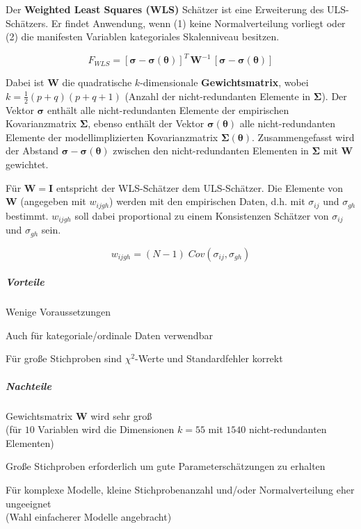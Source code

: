 \documentclass{article}
\numberwithin{equation}{section}
\begin{document}
Der \textbf{Weighted Least Squares (WLS)} Schätzer ist eine Erweiterung des ULS-Schätzers. Er findet Anwendung, wenn (1) keine Normalverteilung vorliegt oder (2) die manifesten Variablen kategoriales Skalenniveau besitzen.

\begin{equation}
F_{WLS} = \left[ \boldsymbol\sigma - \boldsymbol\sigma ( \boldsymbol\theta ) \right]^T \, \mathbf{W}^{-1} \, \left[ \boldsymbol\sigma - \boldsymbol\sigma ( \boldsymbol\theta ) \right]
\end{equation}

Dabei ist $\mathbf{W}$ die quadratische $k$-dimensionale \textbf{Gewichtsmatrix}, wobei $k = \frac{1}{2} (p+q) (p+q+1)$ (Anzahl der nicht-redundanten
Elemente in $\boldsymbol\Sigma$). Der Vektor $\boldsymbol\sigma$ enthält alle nicht-redundanten Elemente der empirischen Kovarianzmatrix $\boldsymbol\Sigma$, ebenso enthält der Vektor $\boldsymbol\sigma ( \boldsymbol\theta )$ alle nicht-redundanten Elemente der modellimplizierten Kovarianzmatrix $\boldsymbol\Sigma ( \boldsymbol\theta )$. Zusammengefasst wird der Abstand $\boldsymbol\sigma - \boldsymbol\sigma ( \boldsymbol\theta )$ zwischen den nicht-redundanten Elementen in $\boldsymbol\Sigma$ mit $\mathbf{W}$ gewichtet.

Für $\mathbf{W} = \mathbf{I}$ entspricht der WLS-Schätzer dem ULS-Schätzer. Die Elemente von $\mathbf{W}$ (angegeben mit $w_{ijgh}$) werden mit den empirischen Daten, d.h. mit $\sigma_{ij}$ und $\sigma_{gh}$ bestimmt. $w_{ijgh}$ soll dabei proportional zu einem Konsistenzen Schätzer von $\sigma_{ij}$ und $\sigma_{gh}$ sein.

\begin{equation}
w_{ijgh} = (N-1)\; Cov(\sigma_{ij},\sigma_{gh})
\end{equation}

\subparagraph*{Vorteile}

\begin{compactitem}
\item Wenige Voraussetzungen
\item Auch für kategoriale/ordinale Daten verwendbar
\item Für große Stichproben sind $\chi^2$-Werte und Standardfehler korrekt
\end{compactitem}

\subparagraph*{Nachteile}

\begin{compactitem}
\item Gewichtsmatrix $\mathbf{W}$ wird sehr groß\\ (für $10$ Variablen wird die Dimensionen $k = 55$ mit $1540$ nicht-redundanten Elementen)
\item Große Stichproben erforderlich um gute Parameterschätzungen zu erhalten
\item Für komplexe Modelle, kleine Stichprobenanzahl und/oder Normalverteilung eher ungeeignet\\ (Wahl einfacherer Modelle angebracht)
\end{compactitem}
\end{document}
